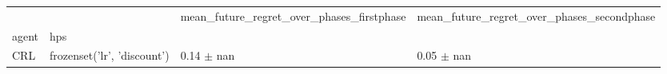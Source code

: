 \begin{tabular}{llll}
\toprule
 &  & mean_future_regret_over_phases_firstphase & mean_future_regret_over_phases_secondphase \\
agent & hps &  &  \\
\midrule
CRL & frozenset({'lr', 'discount'}) & 0.14 $\pm$ nan & 0.05 $\pm$ nan \\
\cline{1-4}
\bottomrule
\end{tabular}
